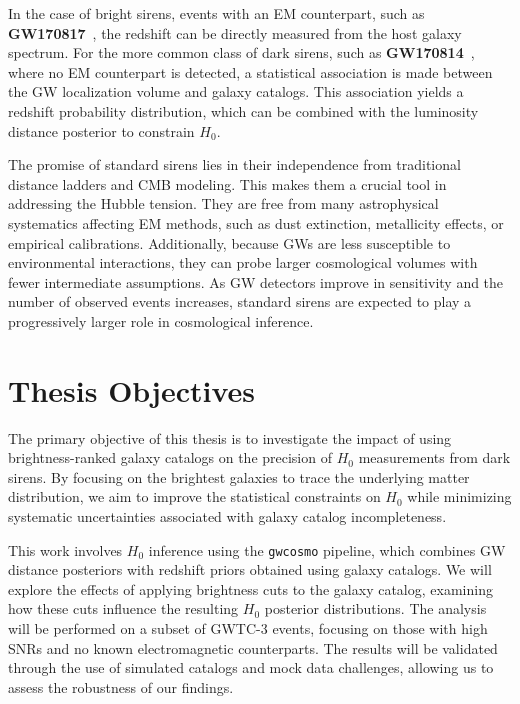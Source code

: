 In the case of bright sirens, events with an \ac{EM} counterpart, such as \textbf{GW170817}~\citep{LIGOScientific:2017adf}, the redshift can be directly measured from the host galaxy spectrum. For the more common class of dark sirens, such as \textbf{GW170814}~\citep{DES:2019ccw}, where no \ac{EM} counterpart is detected, a statistical association is made between the \ac{GW} localization volume and galaxy catalogs. This association yields a redshift probability distribution, which can be combined with the luminosity distance posterior to constrain $H_0$.

The promise of standard sirens lies in their independence from traditional distance ladders and \ac{CMB} modeling. This makes them a crucial tool in addressing the Hubble tension. They are free from many astrophysical systematics affecting \ac{EM} methods, such as dust extinction, metallicity effects, or empirical calibrations. Additionally, because \acp{GW} are less susceptible to environmental interactions, they can probe larger cosmological volumes with fewer intermediate assumptions. As \ac{GW} detectors improve in sensitivity and the number of observed events increases, standard sirens are expected to play a progressively larger role in cosmological inference.

\section{Thesis Objectives}
The primary objective of this thesis is to investigate the impact of using brightness-ranked galaxy catalogs on the precision of $H_0$ measurements from dark sirens. By focusing on the brightest galaxies to trace the underlying matter distribution, we aim to improve the statistical constraints on $H_0$ while minimizing systematic uncertainties associated with galaxy catalog incompleteness.

This work involves $H_0$ inference using the \texttt{gwcosmo} pipeline, which combines \ac{GW} distance posteriors with redshift priors obtained using galaxy catalogs. We will explore the effects of applying brightness cuts to the galaxy catalog, examining how these cuts influence the resulting $H_0$ posterior distributions. The analysis will be performed on a subset of \ac{GWTC}-3 events, focusing on those with high \acp{SNR} and no known electromagnetic counterparts. The results will be validated through the use of simulated catalogs and mock data challenges, allowing us to assess the robustness of our findings.


